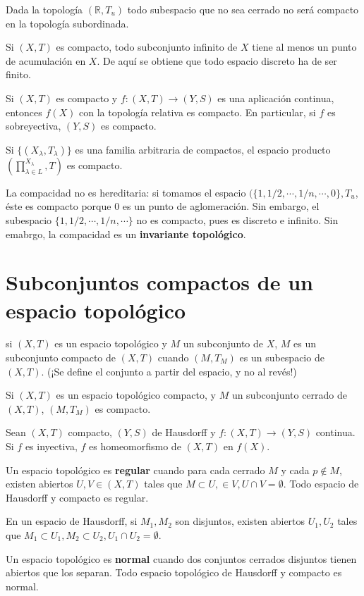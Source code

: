 \documentclass[a4paper, 11pt]{extarticle}
\begin{document}
Dada la topología \((\mathbb{R}, T_u)\) todo subespacio que no sea cerrado no
será compacto en la topología subordinada.

Si \((X,T)\) es compacto, todo subconjunto infinito de \(X\) tiene al menos
un punto de acumulación en \(X\). De aquí se obtiene que todo espacio discreto
ha de ser finito.

Si \((X,T)\) es compacto y \(f:  (X,T) \rightarrow  (Y, S)\) es una
aplicación continua, entonces \(f(X)\) con la topología relativa es compacto.
En particular, si \(f\) es sobreyectiva, \((Y,S)\) es compacto.

Si \(\{ (X_\lambda, T_\lambda) \}\) es una familia arbitraria de compactos, el
espacio producto \((\prod_{\lambda \in L}^{X_\lambda}, T)\) es compacto. 

La compacidad no es hereditaria: si tomamos el espacio \((\{ 1, 1/2, \cdots, 1/n,
\cdots, 0 \},T_u\), éste es compacto porque 0 es un punto de aglomeración. Sin
embargo, el subespacio \(\{ 1, 1/2, \cdots, 1/n, \cdots \}\) no es compacto,
pues es discreto e infinito. Sin emabrgo, la compacidad es un \textbf{invariante topológico}.

\section{Subconjuntos compactos de un espacio topológico}
\label{sec:org841f560}
si \((X,T)\) es un espacio topológico y \(M\) un subconjunto de \(X\), \(M\) es un subconjunto compacto de \((X,T)\) cuando \((M, T_M)\) es un
subespacio de \((X,T)\). (¡Se define el conjunto a partir del espacio, y no al
revés!)

Si \((X,T)\) es un espacio topológico compacto, y \(M\) un subconjunto
cerrado de \((X,T)\), \((M, T_M)\) es compacto. 

Sean \((X,T)\) compacto, \((Y,S)\) de Hausdorff y \(f: (X,T) \rightarrow
(Y,S)\) continua. Si \(f\) es inyectiva, \(f\) es homeomorfismo de \((X,T)\) en \(f(X)\).

Un espacio topológico es \textbf{regular} cuando para cada cerrado \(M\) y cada \(p
\not \in M\), existen abiertos \(U,V \in (X,T)\) tales que \(M \subset U, 
\in V, U \cap V = \emptyset\). Todo espacio de Hausdorff y compacto es regular.

En un espacio de Hausdorff, si \(M_1, M_2\) son disjuntos, existen abiertos \(U_1, U_2\) tales que \(M_1 \subset U_1, M_2 \subset U_2, U_1 \cap U_2 =
\emptyset\). 

Un espacio topológico es \textbf{normal} cuando dos conjuntos cerrados disjuntos tienen
abiertos que los separan. Todo espacio topológico de Hausdorff y compacto es
normal.
\end{document}
